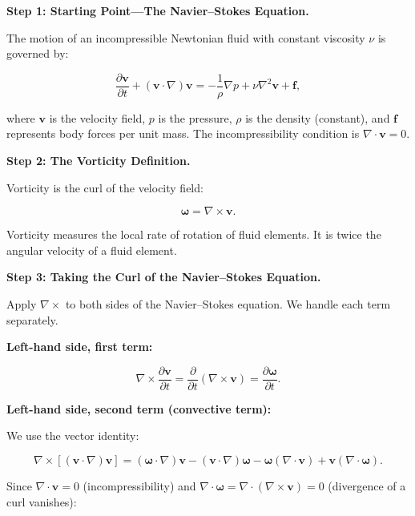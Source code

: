 \textbf{Step 1: Starting Point---The Navier--Stokes Equation.}

The motion of an incompressible Newtonian fluid with constant viscosity $\nu$ is governed by:

\begin{equation}
\frac{\partial \mathbf{v}}{\partial t} + (\mathbf{v}\cdot\nabla)\mathbf{v} = -\frac{1}{\rho}\nabla p + \nu\nabla^2\mathbf{v} + \mathbf{f},
\end{equation}

where $\mathbf{v}$ is the velocity field, $p$ is the pressure, $\rho$ is the density (constant), and $\mathbf{f}$ represents body forces per unit mass. The incompressibility condition is $\nabla\cdot\mathbf{v} = 0$.

\textbf{Step 2: The Vorticity Definition.}

Vorticity is the curl of the velocity field:

\begin{equation}
\boldsymbol{\omega} = \nabla \times \mathbf{v}.
\end{equation}

Vorticity measures the local rate of rotation of fluid elements. It is twice the angular velocity of a fluid element.

\textbf{Step 3: Taking the Curl of the Navier--Stokes Equation.}

Apply $\nabla\times$ to both sides of the Navier--Stokes equation. We handle each term separately.

\textbf{Left-hand side, first term:}

\begin{equation}
\nabla\times\frac{\partial \mathbf{v}}{\partial t} = \frac{\partial}{\partial t}(\nabla\times\mathbf{v}) = \frac{\partial \boldsymbol{\omega}}{\partial t}.
\end{equation}

\textbf{Left-hand side, second term (convective term):}

We use the vector identity:

\begin{equation}
\nabla\times\left[(\mathbf{v}\cdot\nabla)\mathbf{v}\right] = (\boldsymbol{\omega}\cdot\nabla)\mathbf{v} - (\mathbf{v}\cdot\nabla)\boldsymbol{\omega} - \boldsymbol{\omega}(\nabla\cdot\mathbf{v}) + \mathbf{v}(\nabla\cdot\boldsymbol{\omega}).
\end{equation}

Since $\nabla\cdot\mathbf{v} = 0$ (incompressibility) and $\nabla\cdot\boldsymbol{\omega} = \nabla\cdot(\nabla\times\mathbf{v}) = 0$ (divergence of a curl vanishes):

